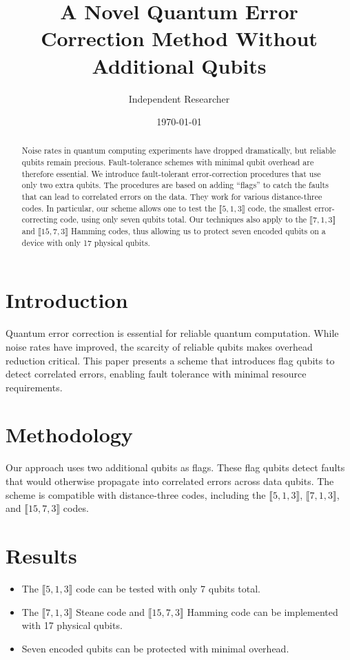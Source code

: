 \documentclass[12pt,a4paper]{article}
\title{A Novel Quantum Error Correction Method Without Additional Qubits}
\author{Independent Researcher}
\date{\today}
\begin{document}
	
	\maketitle
	
	\begin{abstract}
		Noise rates in quantum computing experiments have dropped dramatically, but reliable qubits remain precious. Fault-tolerance schemes with minimal qubit overhead are therefore essential. We introduce fault-tolerant error-correction procedures that use only two extra qubits. The procedures are based on adding ``flags'' to catch the faults that can lead to correlated errors on the data. They work for various distance-three codes. In particular, our scheme allows one to test the $\llbracket 5,1,3 \rrbracket$ code, the smallest error-correcting code, using only seven qubits total. Our techniques also apply to the $\llbracket 7,1,3 \rrbracket$ and $\llbracket 15,7,3 \rrbracket$ Hamming codes, thus allowing us to protect seven encoded qubits on a device with only 17 physical qubits.
	\end{abstract}
	
	\section{Introduction}
	Quantum error correction is essential for reliable quantum computation. While noise rates have improved, the scarcity of reliable qubits makes overhead reduction critical. This paper presents a scheme that introduces flag qubits to detect correlated errors, enabling fault tolerance with minimal resource requirements.
	
	\section{Methodology}
	Our approach uses two additional qubits as flags. These flag qubits detect faults that would otherwise propagate into correlated errors across data qubits. The scheme is compatible with distance-three codes, including the $\llbracket 5,1,3 \rrbracket$, $\llbracket 7,1,3 \rrbracket$, and $\llbracket 15,7,3 \rrbracket$ codes.
	
	\section{Results}
	\begin{itemize}
		\item The $\llbracket 5,1,3 \rrbracket$ code can be tested with only 7 qubits total.
		\item The $\llbracket 7,1,3 \rrbracket$ Steane code and $\llbracket 15,7,3 \rrbracket$ Hamming code can be implemented with 17 physical qubits.
		\item Seven encoded qubits can be protected with minimal overhead.
	\end{itemize}
	
\end{document}

